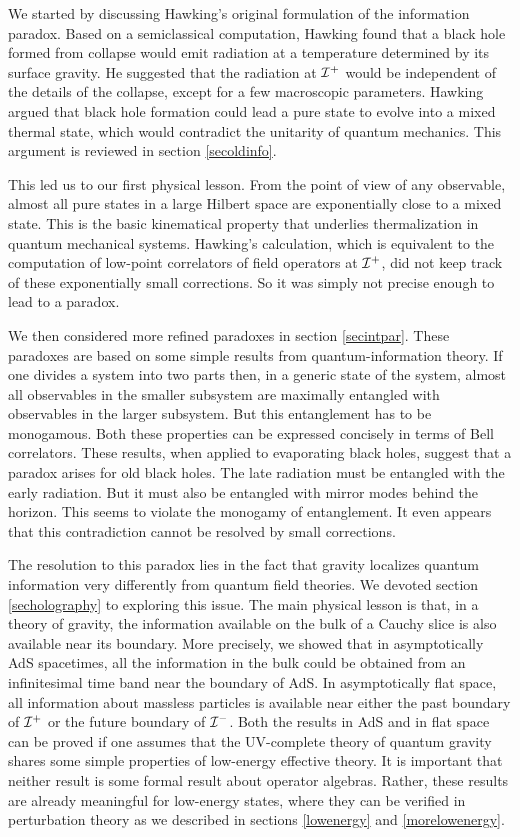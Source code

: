 \documentclass[12pt]{article}
\def \scrip{{\cal I}^{+}}
\def \scrim{{\cal I}^{-}}
\begin{document}
We started by discussing Hawking's original formulation of the information paradox. Based on a semiclassical computation, Hawking found that a black hole formed from collapse would emit radiation at a temperature determined by its surface gravity. He suggested that the radiation at $\scrip$ would be independent of the details of the collapse, except for a few macroscopic parameters. Hawking argued that black hole formation could lead a pure state to evolve into a mixed thermal state, which would contradict the unitarity of quantum mechanics. This argument is reviewed in section \ref{secoldinfo}.

This led us to our first physical lesson. From the point of view of
any observable, almost all pure states in a large Hilbert space are exponentially close to a mixed state. This is the basic kinematical property that underlies
thermalization in quantum mechanical systems. Hawking's calculation, which is
equivalent to the computation of low-point correlators of field operators at $\scrip$, did not keep track of these exponentially small corrections. So it was simply not precise enough to lead to a paradox.

We then considered more refined paradoxes in section \ref{secintpar}. These paradoxes
are based on some simple results from quantum-information theory. If one
divides a system into two parts then, in a generic state of the system, almost all observables in the smaller subsystem are maximally entangled with
observables in the larger subsystem. But this entanglement has to be monogamous. Both these properties can be expressed concisely in terms of Bell correlators. These results, when applied to evaporating black holes,  suggest that a paradox arises for old black holes. The late radiation must be entangled with the early radiation. But it must also be entangled
with mirror modes behind the horizon. This seems to violate the monogamy of entanglement. It even appears that this contradiction cannot
be resolved by small corrections.

The resolution to this paradox lies in the fact that gravity localizes
quantum information very differently from quantum field theories. We devoted section \ref{secholography} to exploring this issue. The main physical lesson is that, in
a theory of gravity, the information available on the bulk of a
Cauchy slice is also available near its boundary. More precisely,
we showed that in asymptotically AdS spacetimes, all the information
in the bulk could be obtained from an infinitesimal time band near the boundary
of AdS. In asymptotically flat space, all information about massless particles
is available near either the past boundary of $\scrip$ or the future boundary of $\scrim$. Both the results in AdS and in flat space can be  proved if one assumes that the UV-complete theory of quantum gravity shares some simple properties of low-energy effective theory. It is important that neither result is
some formal result about operator algebras. Rather, these results are already
meaningful for low-energy states, where they can be verified in perturbation theory as we described in sections \ref{lowenergy} and \ref{morelowenergy}.
\end{document}

